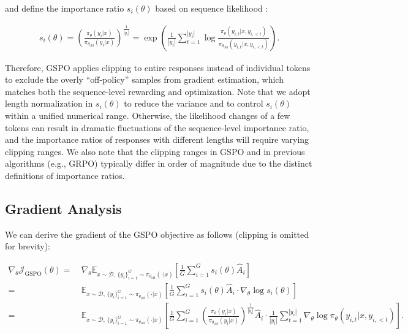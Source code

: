 and define the importance ratio $s_{i}(\theta)$ based on sequence likelihood \citep{click}:

\begin{align}
s_{i}(\theta) = \left( \frac{ \pi_{\theta} (y_i | x) }{ \pi_{\theta_\text{old}} (y_i | x)} \right)^{\frac{1}{|y_i|}}
=
\exp \left( \frac{1}{|y_i|} \sum_{t=1}^{|y_i|} \log \frac{ \pi_{\theta} (y_{i,t} | x, y_{i,<t}) }{ \pi_{\theta_\text{old}} (y_{i,t} | x,y_{i,<t})} \right).
\end{align}

Therefore, GSPO applies clipping to entire responses instead of individual tokens to exclude the overly ``off-policy'' samples from gradient estimation, which matches both the sequence-level rewarding and optimization. Note that we adopt length normalization in $s_{i}(\theta)$ to reduce the variance and to control  $s_{i}(\theta)$ within a unified numerical range. Otherwise, the likelihood changes of a few tokens can result in dramatic fluctuations of the sequence-level importance ratio, and the importance ratios of responses with different lengths will require varying clipping ranges. We also note that the clipping ranges in GSPO and in previous algorithms (e.g., GRPO) typically differ in order of magnitude due to the distinct definitions of importance ratios.

\subsection{Gradient Analysis}
\label{subsec:gradient}

We can derive the gradient of the GSPO objective as follows (clipping is omitted for brevity):

\begin{align}
\nabla_{\theta} \mathcal{J}_\text{GSPO} (\theta)
=&\ 
\nabla_{\theta} \mathbb{E}_{ x \sim \mathcal{D},\, \{y_i\}_{i=1}^G \sim \pi_{\theta_\text{old}}( \cdot | x) }
\left[ 
\frac{1}{G} \sum_{i=1}^{G} s_{i}(\theta) \widehat{A}_{i}
\right] \\
= &\ 
\mathbb{E}_{ x \sim \mathcal{D},\, \{y_i\}_{i=1}^G \sim \pi_{\theta_\text{old}}( \cdot | x) }
\left[ 
\frac{1}{G} \sum_{i=1}^{G}
s_{i}(\theta) \widehat{A}_{i}
\cdot \nabla_{\theta} \log s_{i}(\theta)
\right] \\
=&\ 
\mathbb{E}_{ x \sim \mathcal{D},\, \{y_i\}_{i=1}^G \sim \pi_{\theta_\text{old}}( \cdot | x) }
\left[ 
\frac{1}{G} \sum_{i=1}^{G} 
\left( \frac{ \pi_{\theta} (y_i | x) }{ \pi_{\theta_\text{old}} (y_i | x)} \right)^{\frac{1}{|y_i|}} \widehat{A}_{i} 
\cdot \frac{1}{|y_i|} \sum_{t=1}^{|y_i|} \nabla_{\theta} \log \pi_{\theta} (y_{i,t} | x, y_{i,<t}) 
\right].
\label{equ:gspo_grad}
\end{align}

